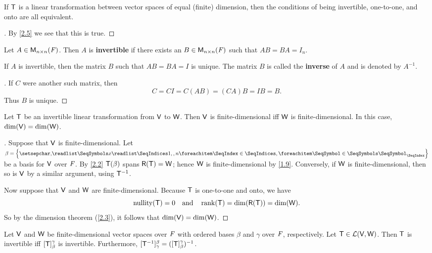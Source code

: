 \begin{cor}\label{2.4.2}
  If \(\mathsf{T}\) is a linear transformation between vector spaces of equal (finite) dimension, then the conditions of being invertible, one-to-one, and onto are all equivalent.
\end{cor}

\begin{proof}[]
  By \cref{2.5} we see that this is true.
\end{proof}

\begin{defn}\label{2.4.3}
  Let \(A \in \mathsf{M}_{{n} \times n}({\mathit{F}})\).
  Then \(A\) is \textbf{invertible} if there exists an \(B \in \mathsf{M}_{{n} \times n}({\mathit{F}})\) such that \(AB = BA = I_n\).
\end{defn}

\begin{cor}\label{2.4.4}
  If \(A\) is invertible, then the matrix \(B\) such that \(AB = BA = I\) is unique.
  The matrix \(B\) is called the \textbf{inverse} of \(A\) and is denoted by \(A^{-1}\).
\end{cor}

\begin{proof}[]
  If \(C\) were another such matrix, then
  \[
    C = CI = C(AB) = (CA)B = IB = B.
  \]
  Thus \(B\) is unique.
\end{proof}

\begin{lem}\label{2.4.5}
  Let \(\mathsf{T}\) be an invertible linear transformation from \(\mathsf{V}\) to \(\mathsf{W}\).
  Then \(\mathsf{V}\) is finite-dimensional iff \(\mathsf{W}\) is finite-dimensional.
  In this case, \(\dim(\mathsf{V}) = \dim(\mathsf{W})\).
\end{lem}

\begin{proof}[]
  Suppose that \(\mathsf{V}\) is finite-dimensional.
  Let \(\beta = \set{\seq{x}{1,,n}}\) be a basis for \(\mathsf{V}\) over \(\mathit{F}\).
  By \cref{2.2} \(\mathsf{T}(\beta)\) spans \(\rg{\T} = \W\);
  hence \(\mathsf{W}\) is finite-dimensional by \cref{1.9}.
  Conversely, if \(\mathsf{W}\) is finite-dimensional, then so is \(\mathsf{V}\) by a similar argument, using \(\mathsf{T}^{-1}\).

  Now suppose that \(\mathsf{V}\) and \(\mathsf{W}\) are finite-dimensional.
  Because \(\mathsf{T}\) is one-to-one and onto, we have
  \[
    \nt{\T} = 0 \quad \text{and} \quad \rk{\T} = \dim(\rg{\T}) = \dim(\W).
  \]
  So by the dimension theorem (\cref{2.3}), it follows that \(\dim(\mathsf{V}) = \dim(\mathsf{W})\).
\end{proof}

\begin{thm}\label{2.18}
  Let \(\mathsf{V}\) and \(\mathsf{W}\) be finite-dimensional vector spaces over \(\mathit{F}\) with ordered bases \(\beta\) and \(\gamma\) over \(\mathit{F}\), respectively.
  Let \(\mathsf{T} \in \mathcal{L}(\mathsf{V}, \mathsf{W})\).
  Then \(\mathsf{T}\) is invertible iff \([\mathsf{T}]_{\beta}^{\gamma}\) is invertible.
  Furthermore, \([\mathsf{T}^{-1}]_{\gamma}^{\beta} = ([\mathsf{T}]_{\beta}^{\gamma})^{-1}\).
\end{thm}

